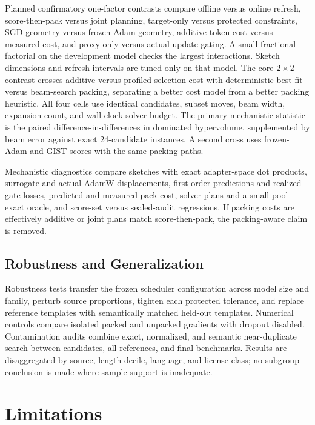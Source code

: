 \documentclass{article}
\begin{document}
Planned confirmatory one-factor contrasts compare offline versus online refresh,
score-then-pack versus joint planning, target-only versus protected constraints,
SGD geometry versus frozen-Adam geometry, additive token cost versus measured
cost, and proxy-only versus actual-update gating. A small fractional factorial
on the development model checks the largest interactions. Sketch dimensions
and refresh intervals are tuned only on that model.
The core $2\times2$ contrast crosses additive versus profiled selection cost
with deterministic best-fit versus beam-search packing, separating a better
cost model from a better packing heuristic. All four cells use identical
candidates, subset moves, beam width, expansion count, and wall-clock solver
budget. The primary mechanistic statistic is the paired
difference-in-differences in dominated hypervolume, supplemented by beam error
against exact 24-candidate instances. A second cross uses frozen-Adam
and GIST scores with the same packing paths.

Mechanistic diagnostics compare sketches with exact adapter-space dot
products, surrogate and actual AdamW displacements, first-order predictions and
realized gate losses, predicted and measured pack cost, solver plans and a
small-pool exact oracle, and score-set versus sealed-audit regressions. If
packing costs are effectively additive or joint plans match score-then-pack,
the packing-aware claim is removed.

\subsection{Robustness and Generalization}

Robustness tests transfer the frozen scheduler configuration across model size
and family, perturb source proportions, tighten each protected tolerance, and
replace reference templates with semantically matched held-out templates.
Numerical controls compare isolated packed and unpacked gradients with dropout
disabled. Contamination audits combine exact, normalized, and semantic
near-duplicate search between candidates, all references, and final benchmarks.
Results are disaggregated by source, length decile, language, and license class;
no subgroup conclusion is made where sample support is inadequate.

\section{Limitations}
\label{sec:limitations}
\end{document}
